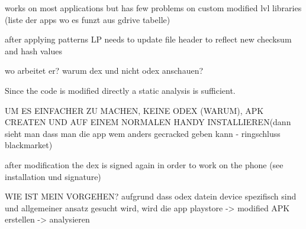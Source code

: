 works on most applications but has few problems on custom modified lvl libraries (liste der apps wo es funzt aus gdrive tabelle)

after applying patterns LP needs to update file header to reflect new checksum and hash values

\cite{munteanLicense}
%

wo arbeitet er?\newline
warum dex und nicht odex anschauen?\newline

Since the code is modified directly a static analysis is sufficient.\newline

UM ES EINFACHER ZU MACHEN, KEINE ODEX (WARUM), APK CREATEN UND AUF EINEM NORMALEN HANDY INSTALLIEREN(dann sieht man dass man die app wem anders gecracked geben kann - ringschluss blackmarket)\newline

after modification the dex is signed again in order to work on the phone (see installation und signature)

WIE IST MEIN VORGEHEN?
aufgrund dass odex datein device spezifisch sind und allgemeiner ansatz gesucht wird, wird die
app playstore -> modified APK erstellen -> analysieren
